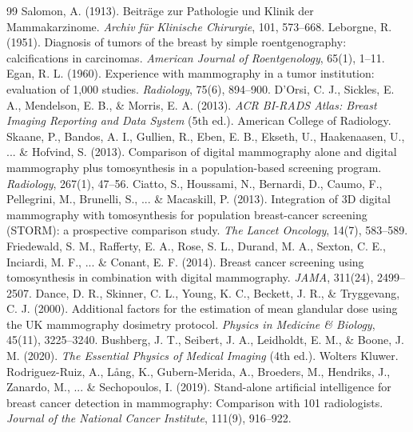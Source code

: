 \documentclass[11pt,a4paper]{article}
\begin{document}
\begin{thebibliography}{99}
 Salomon, A. (1913). Beiträge zur Pathologie und Klinik der Mammakarzinome. \textit{Archiv für Klinische Chirurgie}, 101, 573--668.
 Leborgne, R. (1951). Diagnosis of tumors of the breast by simple roentgenography: calcifications in carcinomas. \textit{American Journal of Roentgenology}, 65(1), 1--11.
 Egan, R. L. (1960). Experience with mammography in a tumor institution: evaluation of 1,000 studies. \textit{Radiology}, 75(6), 894--900.
 D'Orsi, C. J., Sickles, E. A., Mendelson, E. B., \& Morris, E. A. (2013). \textit{ACR BI-RADS Atlas: Breast Imaging Reporting and Data System} (5th ed.). American College of Radiology.
 Skaane, P., Bandos, A. I., Gullien, R., Eben, E. B., Ekseth, U., Haakenaasen, U., ... \& Hofvind, S. (2013). Comparison of digital mammography alone and digital mammography plus tomosynthesis in a population-based screening program. \textit{Radiology}, 267(1), 47--56.
 Ciatto, S., Houssami, N., Bernardi, D., Caumo, F., Pellegrini, M., Brunelli, S., ... \& Macaskill, P. (2013). Integration of 3D digital mammography with tomosynthesis for population breast-cancer screening (STORM): a prospective comparison study. \textit{The Lancet Oncology}, 14(7), 583--589.
 Friedewald, S. M., Rafferty, E. A., Rose, S. L., Durand, M. A., Sexton, C. E., Inciardi, M. F., ... \& Conant, E. F. (2014). Breast cancer screening using tomosynthesis in combination with digital mammography. \textit{JAMA}, 311(24), 2499--2507.
 Dance, D. R., Skinner, C. L., Young, K. C., Beckett, J. R., \& Tryggevang, C. J. (2000). Additional factors for the estimation of mean glandular dose using the UK mammography dosimetry protocol. \textit{Physics in Medicine \& Biology}, 45(11), 3225--3240.
 Bushberg, J. T., Seibert, J. A., Leidholdt, E. M., \& Boone, J. M. (2020). \textit{The Essential Physics of Medical Imaging} (4th ed.). Wolters Kluwer.
 Rodriguez-Ruiz, A., Lång, K., Gubern-Merida, A., Broeders, M., Hendriks, J., Zanardo, M., ... \& Sechopoulos, I. (2019). Stand-alone artificial intelligence for breast cancer detection in mammography: Comparison with 101 radiologists. \textit{Journal of the National Cancer Institute}, 111(9), 916--922.
\end{thebibliography}
\end{document}
